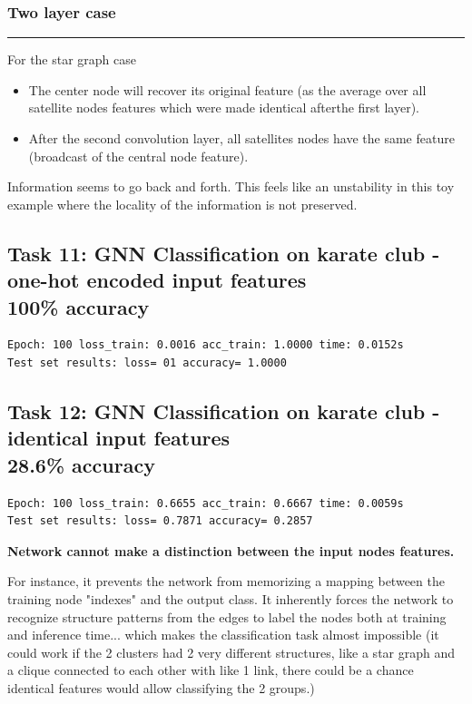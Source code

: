 \documentclass[a4paper]{article}
\begin{document}
\subsubsection*{Two layer case}
\hrule

For the star graph case
\begin{itemize}
    \item The center node will recover its original feature (as the average over all satellite nodes features which were made identical afterthe first layer).
    \item After the second convolution layer, all satellites nodes have the same feature (broadcast of the central node feature).
\end{itemize}
Information seems to go back and forth. This feels like an unstability in this toy example where the locality of the information is not preserved.


\subsection*{Task 11: GNN Classification on karate club - one-hot encoded input features \\ 100\% accuracy}
\begin{verbatim}
Epoch: 100 loss_train: 0.0016 acc_train: 1.0000 time: 0.0152s
Test set results: loss= 01 accuracy= 1.0000
\end{verbatim}

\subsection*{Task 12: GNN Classification on karate club - identical input features \\ 28.6\% accuracy}
\begin{verbatim}
Epoch: 100 loss_train: 0.6655 acc_train: 0.6667 time: 0.0059s
Test set results: loss= 0.7871 accuracy= 0.2857
\end{verbatim}  
\textbf{Network cannot make a distinction between the input nodes features.}

For instance, it prevents the network from memorizing a mapping between the training node "indexes" and the output class.
It inherently forces the network to recognize structure patterns from the edges to label the nodes both at training and inference time...
which makes the classification task almost impossible 
(it could work if the 2 clusters had 2 very different structures, like a star graph and a clique connected to each other with like 1 link,
there could be a chance identical features would allow classifying the 2 groups.)
\end{document}
